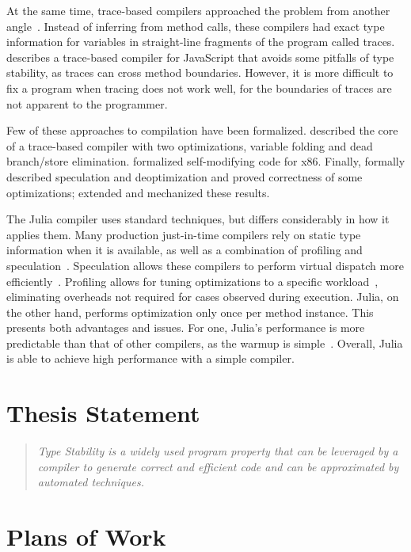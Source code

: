 \documentclass[oneside,openright,titlepage,numbers=noenddot,%
headinclude,footinclude,cleardoublepage=empty,abstract=on,
BCOR=5mm,paper=a4,fontsize=11pt,
dvipsnames
]{scrreprt}
\begin{document}
At the same time, trace-based compilers approached the problem from another
angle~\cite{chang2007efficient}.
Instead of inferring from method calls, these compilers had exact type
information for variables in straight-line fragments of the program called
traces. \citet{gal09} describes a trace-based compiler for JavaScript that avoids
some pitfalls of type stability, as traces can cross method boundaries.
However, it is more difficult to fix a program when tracing does not work well,
for the boundaries of traces are not apparent to the programmer.

Few of these approaches to compilation have been formalized.
\citet{CompilingWithTraces} described the core of a trace-based compiler with
two optimizations, variable folding and dead branch/store elimination.
\citet{VerifiedJITx86} formalized self-modifying code for x86. Finally,
\citet{popl18} formally described speculation and deoptimization and proved
correctness of some optimizations; \citet{oopsla21} extended and mechanized
these results.

The Julia compiler uses standard techniques, but differs considerably in how it
applies them. Many production just-in-time compilers rely on static type
information when it is available, as well as a combination of profiling and
speculation~\cite{TruffleIR,TruffleInterpreters}. Speculation allows these
compilers to perform virtual dispatch more efficiently~\cite{oopsla20c}. Profiling allows
for tuning optimizations to a specific workload~\cite{GoWithTheFlow,HHVMJIT},
eliminating overheads not required for cases observed during execution. Julia, on
the other hand, performs optimization only once per method instance.
This presents both advantages
and issues. For one, Julia's performance is more predictable than that of other
compilers, as the warmup is simple~\cite{VMsBlow}. Overall, Julia is able
to achieve high performance with a simple compiler.




\chapter{Thesis Statement}%
\label{chap-th}

\begin{quote}\itshape
Type Stability
is a widely used program property that can be leveraged by a compiler to generate
correct and efficient code
and can be approximated by automated techniques.
\end{quote}





\chapter{Plans of Work}%
\label{chap-proposed}
\end{document}
